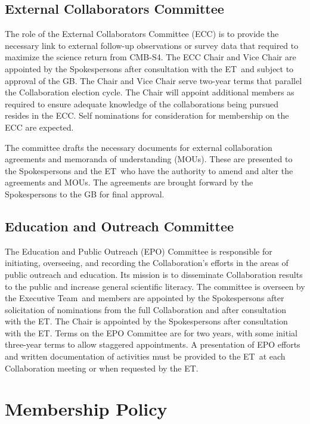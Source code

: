\documentclass[12pt]{article}
\newcommand{\Comment}[1]{\textcolor{Blue}{(Comment: #1)}}
\newcommand{\exec}{{Executive Team}}
\newcommand{\shorte}{{ET}}  %
\newcommand\collabname{CMB-S4}
\begin{document}
\subsection{External Collaborators Committee}

The role of the External Collaborators Committee (ECC) is to provide the necessary link to external follow-up observations or survey data that required to maximize the science return from \collabname. The ECC Chair and Vice Chair are appointed by the Spokespersons after consultation with the \shorte\ and subject to approval of the GB.  %
The Chair and Vice Chair serve two-year terms that parallel the Collaboration election cycle. The Chair will appoint additional members as required to ensure adequate knowledge of the collaborations being pursued resides in the ECC. Self nominations for consideration for membership on the ECC are expected. 

The committee drafts the necessary documents for external collaboration agreements and memoranda of understanding (MOUs). These are presented to the Spokespersons and the \shorte\ who have the authority to amend and alter the agreements and MOUs. The agreements are brought forward by the Spokespersons to the GB for final approval. %

\subsection{Education and Outreach Committee}

The Education and Public Outreach (EPO) Committee is responsible for initiating, overseeing, and recording the Collaboration's efforts in the areas of public outreach and education. Its mission is to disseminate Collaboration results to the public and increase general scientific literacy. The committee is overseen by the \exec \ and members are appointed by the Spokespersons after solicitation of nominations from the full Collaboration and after consultation with the \shorte.
 The Chair is appointed by the Spokespersons after consultation with the \shorte.  Terms on the EPO Committee are for two years, with some initial three-year terms to allow staggered appointments.   A presentation of EPO efforts and written documentation of activities must be provided to the \shorte\ at each Collaboration meeting or when requested by the \shorte. 

\section{Membership Policy}
\end{document}
